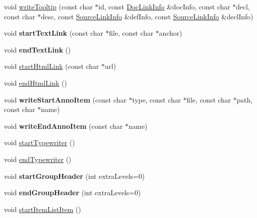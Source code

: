 \begin{DoxyCompactItemize}
void \mbox{\hyperlink{class_output_list_a3cebc68a6a4524ef4b78c4e81d5127eb}{write\+Tooltip}} (const char $\ast$id, const \mbox{\hyperlink{struct_doc_link_info}{Doc\+Link\+Info}} \&doc\+Info, const char $\ast$decl, const char $\ast$desc, const \mbox{\hyperlink{struct_source_link_info}{Source\+Link\+Info}} \&def\+Info, const \mbox{\hyperlink{struct_source_link_info}{Source\+Link\+Info}} \&decl\+Info)
\item 
\mbox{\label{class_output_list_ad4fb4cab0e1a0f5e6e7b56ac820456c9}} 
void {\bfseries start\+Text\+Link} (const char $\ast$file, const char $\ast$anchor)
\item 
\mbox{\label{class_output_list_a74e89e9bcca41e9203ca080fc127a004}} 
void {\bfseries end\+Text\+Link} ()
\item 
void \mbox{\hyperlink{class_output_list_acfe3869e533af42c1446e2fc91a37e5e}{start\+Html\+Link}} (const char $\ast$url)
\item 
void \mbox{\hyperlink{class_output_list_a14c59e71b1bb4cb6a6366a09ea62545f}{end\+Html\+Link}} ()
\item 
\mbox{\label{class_output_list_ad50796b07d2302513be97de3491d7eea}} 
void {\bfseries write\+Start\+Anno\+Item} (const char $\ast$type, const char $\ast$file, const char $\ast$path, const char $\ast$name)
\item 
\mbox{\label{class_output_list_a2059cf013631d0c66b4edb919c3b5acc}} 
void {\bfseries write\+End\+Anno\+Item} (const char $\ast$name)
\item 
void \mbox{\hyperlink{class_output_list_a848e77a8fd7af578497f7ee1ec163b98}{start\+Typewriter}} ()
\item 
void \mbox{\hyperlink{class_output_list_ad83302c45e73f387c9dc13789df012f7}{end\+Typewriter}} ()
\item 
\mbox{\label{class_output_list_a08659f3995b246a54846fbcd5da928bd}} 
void {\bfseries start\+Group\+Header} (int extra\+Levels=0)
\item 
\mbox{\label{class_output_list_aa655c0592e136ba962ac45bb69482638}} 
void {\bfseries end\+Group\+Header} (int extra\+Levels=0)
\item 
void \mbox{\hyperlink{class_output_list_a77e30e9a84b48907b886e8231dbbc20b}{start\+Item\+List\+Item}} ()

\end{DoxyCompactItemize}
